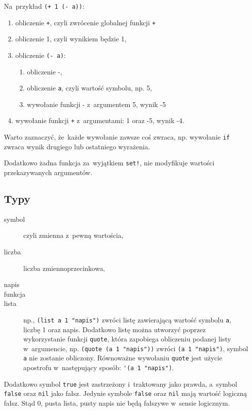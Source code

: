 \documentclass[a4paper,11pt]{article}
\begin{document}
Na~przykład \verb|(+ 1 (- a))|:
\begin{enumerate}
\item obliczenie \verb|+|, czyli zwrócenie globalnej funkcji \verb|+|
\item obliczenie 1, czyli wynikiem będzie 1,
\item obliczenie \verb+(- a)+:
  \begin{enumerate}
  \item obliczenie -,
  \item obliczenie \verb+a+, czyli wartość symbolu, np. 5,
  \item wywołanie funkcji - z~argumentem 5, wynik -5
  \end{enumerate}
\item wywołanie funkcji \verb|+| z~argumentami: 1 oraz -5, wynik -4.
\end{enumerate}

Warto zaznaczyć, że~każde wywołanie zawsze coś zwraca, np. wywołanie \verb+if+
zwraca wynik drugiego lub ostatniego wyrażenia.

Dodatkowo żadna funkcja za~wyjątkiem \verb+set!+, nie modyfikuje wartości
przekazywanych argumentów.

\subsection{Typy}

\begin{description}
\item[symbol] czyli zmienna z~pewną wartościa,
\item[liczba] liczba zmiennoprzecinkowa,
\item[napis]
\item[funkcja]
\item[lista] np., \verb+(list a 1 "napis")+ zwróci listę zawierającą wartość
  symbolu \verb+a+, liczbę 1 oraz napis. Dodatkowo listę można utworzyć
  poprzez wykorzystanie funkcji \verb+quote+, która zapobiega obliczeniu
  podanej listy w~argumencie, np. \verb+(quote (a 1 "napis"))+ zwróci
  \verb+(a 1 "napis")+, symbol \verb+a+ nie zostanie obliczony. Równoważne
  wywołaniu \verb+quote+ jest użycie apostrofu w~następujący sposób:
  \verb+'(a 1 "napis")+.
\end{description}

Dodatkowo symbol \verb+true+ jest zastrzeżony i~traktowany jako prawda,
a~symbol \verb+false+ oraz \verb+nil+ jako fałsz. Jedynie symbole \verb+false+
oraz \verb+nil+ mają wartość logiczną fałsz. Stąd 0, pusta lista, pusty napis
nie będą fałszywe w~sensie logicznym.
\end{document}
